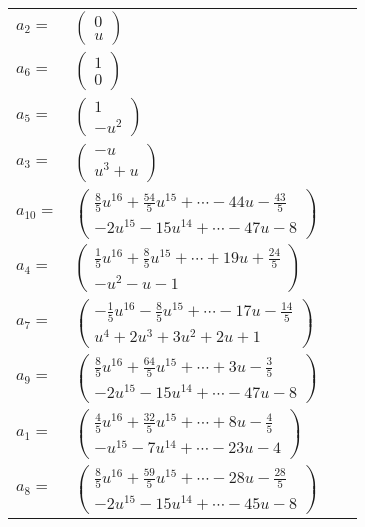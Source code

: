 \documentclass[1p]{elsarticle_modified}
\theoremstyle{definition}
\begin{document}
\begin{tabular}{m{7pt} m{180pt} m{7pt} m{180pt} }
\flushright $a_{2}=$&$\begin{pmatrix}0\\u\end{pmatrix}$ \\
\flushright $a_{6}=$&$\begin{pmatrix}1\\0\end{pmatrix}$ \\
\flushright $a_{5}=$&$\begin{pmatrix}1\\- u^2\end{pmatrix}$ \\
\flushright $a_{3}=$&$\begin{pmatrix}- u\\u^3+u\end{pmatrix}$ \\
\flushright $a_{10}=$&$\begin{pmatrix}\frac{8}{5} u^{16}+\frac{54}{5} u^{15}+\cdots-44 u-\frac{43}{5}\\-2 u^{15}-15 u^{14}+\cdots-47 u-8\end{pmatrix}$ \\
\flushright $a_{4}=$&$\begin{pmatrix}\frac{1}{5} u^{16}+\frac{8}{5} u^{15}+\cdots+19 u+\frac{24}{5}\\- u^2- u-1\end{pmatrix}$ \\
\flushright $a_{7}=$&$\begin{pmatrix}-\frac{1}{5} u^{16}-\frac{8}{5} u^{15}+\cdots-17 u-\frac{14}{5}\\u^4+2 u^3+3 u^2+2 u+1\end{pmatrix}$ \\
\flushright $a_{9}=$&$\begin{pmatrix}\frac{8}{5} u^{16}+\frac{64}{5} u^{15}+\cdots+3 u-\frac{3}{5}\\-2 u^{15}-15 u^{14}+\cdots-47 u-8\end{pmatrix}$ \\
\flushright $a_{1}=$&$\begin{pmatrix}\frac{4}{5} u^{16}+\frac{32}{5} u^{15}+\cdots+8 u-\frac{4}{5}\\- u^{15}-7 u^{14}+\cdots-23 u-4\end{pmatrix}$ \\
\flushright $a_{8}=$&$\begin{pmatrix}\frac{8}{5} u^{16}+\frac{59}{5} u^{15}+\cdots-28 u-\frac{28}{5}\\-2 u^{15}-15 u^{14}+\cdots-45 u-8\end{pmatrix}$ \\

\end{tabular}
\end{document}
